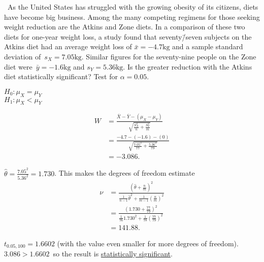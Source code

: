 \begin{problem}
  ~As the United States has struggled with the growing obesity of its citizens, diets have become big business. Among the many competing regimens for those seeking weight reduction are the Atkins and Zone diets. In a comparison of these two diets for one-year weight loss, a study found that seventy\=/seven subjects on the Atkins diet had an average weight loss of ${\bar{x} = -4.7\text{kg}}$ and a sample standard deviation of~${s_X =7.05\text{kg}}$. Similar figures for the seventy-nine people on the Zone diet were~${\bar{y} = -1.6\text{kg}}$ and ${s_Y = 5.36\text{kg}}$. Is the greater reduction with the Atkins diet statistically significant? Test for ${\alpha = 0.05}$.
\end{problem}

\noindent
${H_0: \mu_{X} = \mu_{Y}}$ \\
${H_1: \mu_{X} < \mu_{Y}}$

\begin{align}
  W &= \frac{\bar{X} - \bar{Y} - (\mu_{X} - \mu_{Y})}{\sqrt{\frac{S_{X}^{2}}{n} + \frac{S_{Y}^{2}}{m}}} \\
    &= \frac{-4.7 - (-1.6) - (0)}{\sqrt{\frac{7.05^2}{77}+\frac{5.36^2}{79}}} \\
    &= -3.086\text{.}
\end{align}

\noindent
${\hat{\theta} = \frac{7.05^2}{5.36^2} = 1.730}$.  This makes the degrees of freedom estimate
\begin{align}
  \nu &= \frac{(\hat{\theta} + \frac{n}{m})^2}{\frac{1}{n-1}\hat{\theta}^2 + \frac{1}{m-1}\left(\frac{n}{m}\right)^2} \\
      &= \frac{\left(1.730 + \frac{77}{79}\right)^2}{\frac{1}{76} 1.730^2 + \frac{1}{78}\left(\frac{77}{79}\right)^2} \\
      &= 141.88 \text{.}
\end{align}

\noindent
${t_{0.05,100} = 1.6602}$ (with the value even smaller for more degrees of freedom).  ${3.086 > 1.6602}$~so  the result is \underline{statistically significant}.
